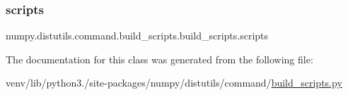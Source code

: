 \subsubsection{\texorpdfstring{scripts}{scripts}}
{\footnotesize\ttfamily numpy.\+distutils.\+command.\+build\+\_\+scripts.\+build\+\_\+scripts.\+scripts}



The documentation for this class was generated from the following file\+:\begin{DoxyCompactItemize}
\item 
venv/lib/python3./site-\/packages/numpy/distutils/command/\hyperlink{numpy_2distutils_2command_2build__scripts_8py}{build\+\_\+scripts.\+py}\end{DoxyCompactItemize}
